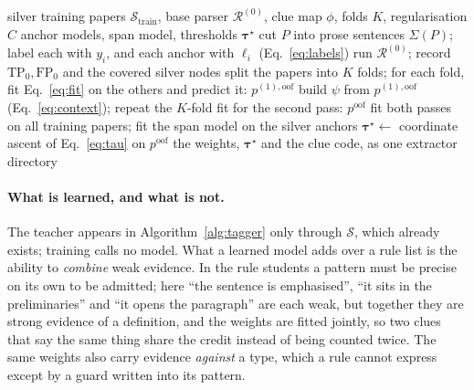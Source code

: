 \documentclass[10pt]{article}
\newcommand{\tagger}{\textsc{Tag}}
\begin{document}
\begin{algorithm}[t]
\caption{\tagger{} distillation, for the supervision $\mathcal{S}_{\mathrm{train}}$.}
\label{alg:tagger}
\let\AND\relax
\begin{algorithmic}[1]
\REQUIRE silver training papers $\mathcal{S}_{\mathrm{train}}$, base parser $\mathcal{R}^{(0)}$, clue map $\phi$, folds $K$, regularisation $C$
\ENSURE anchor models, span model, thresholds $\boldsymbol{\tau}^\star$
  \STATE cut $P$ into prose sentences $\Sigma(P)$; label each with $y_i$, and each anchor with $\ell_i$ (Eq.~\ref{eq:labels})
  \STATE run $\mathcal{R}^{(0)}$; record $\mathrm{TP}_0,\mathrm{FP}_0$ and the covered silver nodes
\ENDFOR
\STATE split the papers into $K$ folds; for each fold, fit Eq.~\eqref{eq:fit} on the others and predict it: $p^{(1),\mathrm{oof}}$
\STATE build $\psi$ from $p^{(1),\mathrm{oof}}$ (Eq.~\ref{eq:context}); repeat the $K$-fold fit for the second pass: $p^{\mathrm{oof}}$
\STATE fit both passes on all training papers; fit the span model on the silver anchors
\STATE $\boldsymbol{\tau}^\star\gets$ coordinate ascent of Eq.~\eqref{eq:tau} on $p^{\mathrm{oof}}$
\RETURN the weights, $\boldsymbol{\tau}^\star$ and the clue code, as one extractor directory
\end{algorithmic}
\end{algorithm}

\paragraph{What is learned, and what is not.}
The teacher appears in Algorithm~\ref{alg:tagger} only through $\mathcal{S}$, which already exists; training calls no model. What a learned model adds over a rule list is the ability to \emph{combine} weak evidence. In the rule students a pattern must be precise on its own to be admitted; here ``the sentence is emphasised'', ``it sits in the preliminaries'' and ``it opens the paragraph'' are each weak, but together they are strong evidence of a definition, and the weights are fitted jointly, so two clues that say the same thing share the credit instead of being counted twice. The same weights also carry evidence \emph{against} a type, which a rule cannot express except by a guard written into its pattern.
\end{document}
